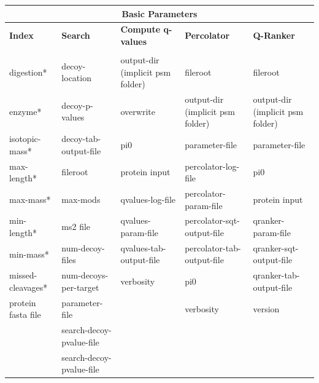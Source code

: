 \documentclass{article}
\begin{document}
\begin{table}
\scriptsize
\begin{tabular}{lllll}
\hline
\multicolumn{5}{c}{Basic Parameters} \\
\hline
\textbf{Index}&\textbf{Search}&\textbf{Compute q-values}&\textbf{Percolator} &\textbf{Q-Ranker} \\
\hline \\
digestion*            &decoy-location                    &output-dir (implicit psm folder) &fileroot                         &fileroot                         \\
enzyme*               &decoy-p-values                    &overwrite                        &output-dir (implicit psm folder) &output-dir (implicit psm folder) \\
isotopic-mass*        &decoy-tab-output-file             &pi0                              &parameter-file                   &parameter-file                   \\
max-length*           &fileroot                          &protein input                    &percolator-log-file              &pi0                              \\
max-mass*             &max-mods                          &qvalues-log-file                 &percolator-param-file            &protein input                    \\
min-length*           &ms2 file                          &qvalues-param-file               &percolator-sqt-output-file       &qranker-param-file               \\
min-mass*             &num-decoy-files                   &qvalues-tab-output-file          &percolator-tab-output-file       &qranker-sqt-output-file          \\
missed-cleavages*     &num-decoys-per-target             &verbosity                        &pi0                              &qranker-tab-output-file          \\
protein fasta file   &parameter-file                    &                                 &verbosity                        &version                          \\
                     &search-decoy-pvalue-file          &                                 &                                 &                                 \\
                     &search-decoy-pvalue-file          &                                 &                                 &                                 \\

\end{tabular}
\end{table}
\end{document}
